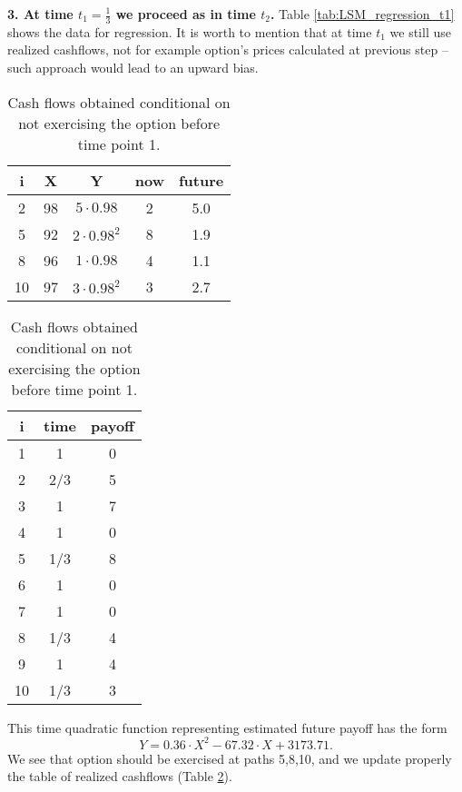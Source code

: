 \documentclass[a4paper,12pt, oneside]{book}
\theoremstyle{definition}
\theoremstyle{remark}
\begin{document}
\noindent \textbf{3. At time $t_1 = \frac{1}{3}$ we proceed as in time $t_2$.}
Table \ref{tab:LSM_regression_t1} shows the data for regression. It is worth to mention that at time $t_1$ we still use realized cashflows, not for example option's prices calculated at previous step -- such approach would lead to an upward bias.
\begin{table}[!ht]
\parbox{.45\linewidth} {
  \centering
  \caption{Estimating future payoffs at time point 1.}
  \label{tab:LSM_regression_t1}
  \begin{tabular} {||c |c |c || c | c ||}  
  \hline 
    i & X   &  Y  & now   &  future\\ \hline \hline
    2 & 98 & $5\cdot 0.98$ & 2 & 5.0 \\ \hline
    5 & 92 & $2\cdot 0.98^2$ & 8 & 1.9  \\ \hline
    8 & 96 & $1\cdot 0.98$ & 4 & 1.1 \\ \hline
  10 & 97 & $3\cdot 0.98^2$ & 3 & 2.7 \\ \hline
  \end{tabular}
}
\qquad
\parbox{.45\linewidth} {
  \centering
  \caption{Cash flows obtained conditional on not exercising the option before time point 1.}
  \label{tab:LSM_cashflows_t1}
  \begin{tabular}{|| c | c | c ||}
  \hline 
  i  & time  &  payoff \\ \hline \hline
  1  & 1     &      0 \\ \hline
  2  & 2/3   &      5 \\ \hline
  3  & 1     &      7 \\ \hline
  4  & 1     &      0 \\ \hline
  5  & 1/3   &      8 \\ \hline
  6  & 1     &      0 \\ \hline
  7  & 1     &      0 \\ \hline
  8  & 1/3   &      4 \\ \hline
  9  & 1     &      4 \\ \hline
  10  & 1/3   &      3 \\ \hline
  \end{tabular}
}
\end{table}

This time quadratic function representing estimated future payoff has the form
\[ Y = 0.36\cdot X^2 - 67.32\cdot X + 3173.71. \]
We see that option should be exercised at paths 5,8,10, and we update properly the table of realized cashflows (Table \ref{tab:LSM_cashflows_t1}).
\end{document}
